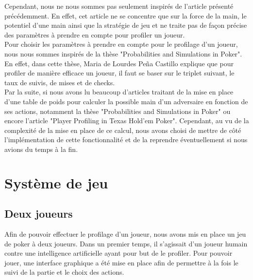 \documentclass{report}
\begin{document}
Cependant, nous ne nous sommes pas seulement inspirés de l'article présenté précédemment. En effet, cet article ne se concentre que sur la force de la main, le potentiel d'une main ainsi que la stratégie de jeu et ne traite pas de façon précise des paramètres à prendre en compte pour profiler un joueur. \\

Pour choisir les paramètres à prendre en compte pour le profilage d'un joueur, nous nous sommes inspirés de la thèse "Probabilities and Simulations in Poker". En effet, dans cette thèse, Maria de Lourdes Peña Castillo explique que pour profiler de manière efficace un joueur, il faut se baser sur le triplet suivant, le taux de suivis, de mises et de checks. \\

Par la suite, si nous avons lu beaucoup d'articles traitant de la mise en place d'une table de poids pour calculer la possible main d'un adversaire en fonction de ses actions, notamment la thèse "Probabilities and Simulations in Poker" ou encore l'article "Player Profiling in Texas Hold'em Poker". Cependant, au vu de la complexité de la mise en place de ce calcul, nous avons choisi de mettre de côté l'implémentation de cette fonctionnalité et de la reprendre éventuellement si nous avions du temps à la fin. \\




%
%
%
%
%
%
%
%

\section{Système de jeu}

\subsection{Deux joueurs}
\hspace{0.5cm}Afin de pouvoir effectuer le profilage d'un joueur, nous avons mis en place un jeu de poker à deux joueurs. Dans un premier temps, il s'agissait d'un joueur humain contre une intelligence artificielle ayant pour but de le profiler. Pour pouvoir jouer, une interface graphique a été mise en place afin de permettre à la fois le suivi de la partie et le choix des actions.\\
\end{document}

